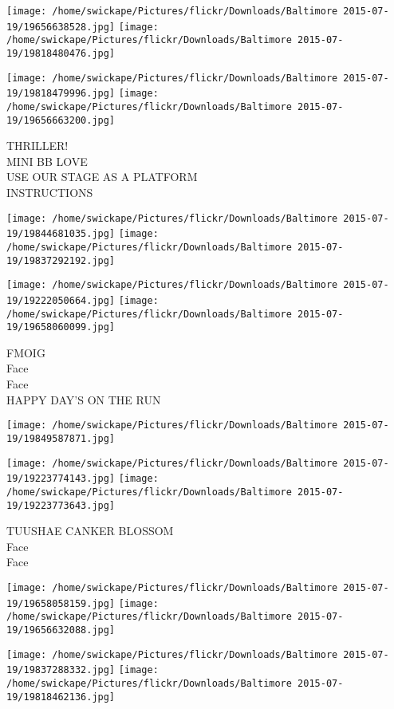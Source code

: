 \documentclass[10pt,letterpaper]{article}
\begin{document}
\texttt{[image: /home/swickape/Pictures/flickr/Downloads/Baltimore 2015-07-19/19656638528.jpg]}
\texttt{[image: /home/swickape/Pictures/flickr/Downloads/Baltimore 2015-07-19/19818480476.jpg]}

\texttt{[image: /home/swickape/Pictures/flickr/Downloads/Baltimore 2015-07-19/19818479996.jpg]}
\texttt{[image: /home/swickape/Pictures/flickr/Downloads/Baltimore 2015-07-19/19656663200.jpg]}

THRILLER!\\
MINI BB LOVE\\
USE OUR STAGE AS A PLATFORM\\
INSTRUCTIONS\\
\pagebreak

\texttt{[image: /home/swickape/Pictures/flickr/Downloads/Baltimore 2015-07-19/19844681035.jpg]}
\texttt{[image: /home/swickape/Pictures/flickr/Downloads/Baltimore 2015-07-19/19837292192.jpg]}

\texttt{[image: /home/swickape/Pictures/flickr/Downloads/Baltimore 2015-07-19/19222050664.jpg]}
\texttt{[image: /home/swickape/Pictures/flickr/Downloads/Baltimore 2015-07-19/19658060099.jpg]}

FMOIG\\
Face\\
Face\\
HAPPY DAY'S ON THE RUN\\
\pagebreak

\texttt{[image: /home/swickape/Pictures/flickr/Downloads/Baltimore 2015-07-19/19849587871.jpg]}

\vspace{0.25in}
\texttt{[image: /home/swickape/Pictures/flickr/Downloads/Baltimore 2015-07-19/19223774143.jpg]}
\texttt{[image: /home/swickape/Pictures/flickr/Downloads/Baltimore 2015-07-19/19223773643.jpg]}

TUUSHAE CANKER BLOSSOM\\
Face\\
Face\\
\pagebreak

\texttt{[image: /home/swickape/Pictures/flickr/Downloads/Baltimore 2015-07-19/19658058159.jpg]}
\texttt{[image: /home/swickape/Pictures/flickr/Downloads/Baltimore 2015-07-19/19656632088.jpg]}

\texttt{[image: /home/swickape/Pictures/flickr/Downloads/Baltimore 2015-07-19/19837288332.jpg]}
\texttt{[image: /home/swickape/Pictures/flickr/Downloads/Baltimore 2015-07-19/19818462136.jpg]}
\end{document}
